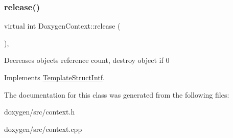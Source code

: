 \mbox{\label{class_doxygen_context_a6121205533d3518b8add76e569f80d10}} 
\subsubsection{\texorpdfstring{release()}{release()}}
{\footnotesize\ttfamily virtual int Doxygen\+Context\+::release (\begin{DoxyParamCaption}{ }\end{DoxyParamCaption})\hspace{0.3cm}{\ttfamily [inline]}, {\ttfamily [virtual]}}

Decreases object\textquotesingle{}s reference count, destroy object if 0 

Implements \mbox{\hyperlink{class_template_struct_intf_a3dce7dd29d3f66a8080b40578e8a5045}{Template\+Struct\+Intf}}.



The documentation for this class was generated from the following files\+:\begin{DoxyCompactItemize}
\item 
doxygen/src/context.\+h\item 
doxygen/src/context.\+cpp\end{DoxyCompactItemize}
